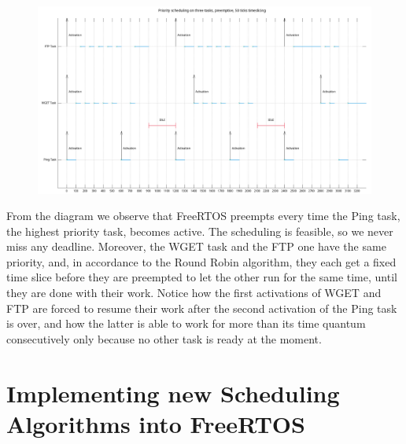 \documentclass[10pt]{article}
\begin{document}
\begin{figure}[H]
    \centering
    \includegraphics[width=1.0\linewidth]{Pictures/preemRR12feb.png}
    \caption{}
    \label{fig:14}
\end{figure}

From the diagram we observe that FreeRTOS preempts every time the Ping task, the highest priority task, becomes active.
The scheduling is feasible, so we never miss any deadline.
Moreover, the WGET task and the FTP one have the same priority, and, in accordance to the Round Robin algorithm, they each get a fixed time slice before they are preempted to let the other run for the same time, until they are done with their work.
Notice how the first activations of WGET and FTP are forced to resume their work after the second activation of the Ping task is over, and how the latter is able to work for more than its time quantum consecutively only because no other task is ready at the moment.

\newpage

\part{Implementing new Scheduling Algorithms into FreeRTOS}
\end{document}
